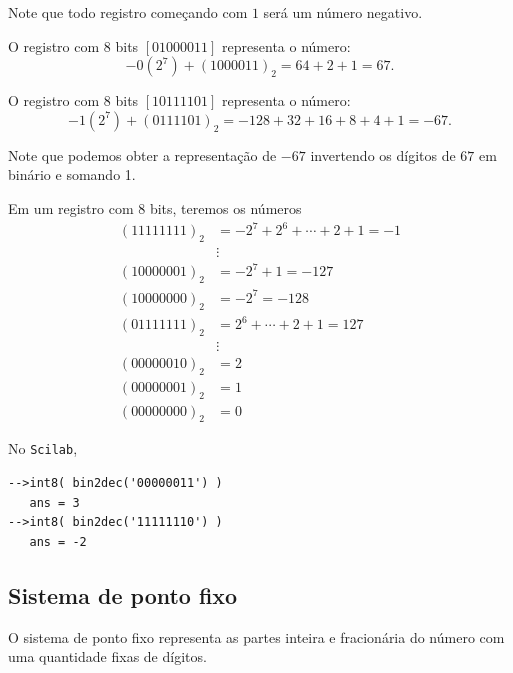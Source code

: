 Note que todo registro começando com $1$ será um número negativo.

\begin{ex}
 O registro com $8$ bits $[01000011]$ representa o número:
 \begin{equation*}
   -0(2^7)+(1000011)_2=64+2+1=67.
 \end{equation*}
 
 O registro com $8$ bits $[10111101]$ representa o número:
 \begin{equation*}
   -1(2^7)+(0111101)_2=-128+ 32+16+8+4+1=-67.
 \end{equation*}

 Note que podemos obter a representação de $-67$ invertendo os dígitos de $67$ em binário e somando 1.
\end{ex}

\begin{ex}
Em um registro com $8$ bits, teremos os números
\begin{equation*}
  \begin{split}
    (11111111)_2 &= -2^7+2^{6}+\cdots+2+1=-1\\
    &\vdots   \\
    (10000001)_2 &= -2^7+1 = -127 \\
    (10000000)_2 &= -2^7   = -128 \\
    (01111111)_2 &= 2^6+\cdots+2+1=127 \\
    &\vdots   \\
    (00000010)_2 &= 2 \\
    (00000001)_2 &= 1 \\
    (00000000)_2 &= 0
  \end{split}
\end{equation*}
\end{ex}

\ifisscilab
\begin{ex}
  No \verb+Scilab+,
\begin{verbatim}
-->int8( bin2dec('00000011') )
   ans = 3
-->int8( bin2dec('11111110') )
   ans = -2
\end{verbatim}
\end{ex}
\fi


\subsection{Sistema de ponto fixo}

O sistema de ponto fixo representa as partes inteira e fracionária do número com uma quantidade fixas de dígitos.

